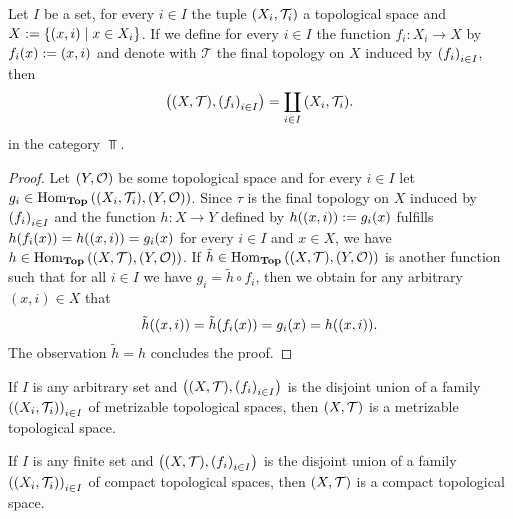 \begin{lemma}
	Let $I$ be a set, for every $i \in I$ the tuple ${\left ( X_i, \mathcal{T}_i \right )}$ a topological space and $X := {\left \{ {\left ( x, i \right )} \mid x \in X_i \right \}}$. If we define for every $i \in I$ the function $f_i: X_i \to X$ by $f_i(x) := {\left ( x, i \right )}$ and denote with $\mathcal{T}$ the final topology on $X$ induced by ${\left ( f_i \right )}_{i \in I}$, then
	\begin{align*}
		\pbraces{\tspace, \pbraces{f_i}_{i \in I}} = \coprod_{i \in I} \pbraces{X_i, \mathcal{T}_i}.
	\end{align*}
	in the category $\Top$. 
\end{lemma}
\begin{proof}
	Let $\tspace[Y][O]$ be some topological space and for every $i \in I$ let $g_i \in \Hom_\Top\pbraces{\pbraces{X_i, \mathcal{T}_i}, \tspace[Y][O]}$. Since $\tau$ is the final topology on $X$ induced by ${\left ( f_i \right )}_{i \in I}$ and the function $h: X \to Y$ defined by $h{\left ( (x,i) \right )} := g_i(x)$ fulfills $h{\left ( f_i(x) \right )} = h{\left ( (x,i) \right )} = g_i(x)$ for every $i \in I$ and $x \in X$, we have $h \in \Hom_\Top\pbraces{\tspace, \tspace[Y][O]}$. 
	If $\tilde{h} \in \Hom_\Top\pbraces{\tspace, \tspace[Y][O]}$ is another function such that for all $i \in I$ we have $g_i = \tilde{h} \circ f_i$, then we obtain for any arbitrary $(x,i) \in X$ that
	\begin{align*}
		\tilde{h}{\left ( (x,i) \right )} = \tilde{h}{\left ( f_i(x) \right )} = g_i(x) = h{\left ( (x,i) \right )}.
	\end{align*}
	The observation $\tilde{h} = h$ concludes the proof.
\end{proof}

\begin{lemma}\label{lemma:disjoint_met}
	If $I$ is any arbitrary set and $\pbraces{\tspace, \pbraces{f_i}_{i \in I}}$ is the disjoint union of a family $\pbraces{\indtspace}_{i \in I}$ of metrizable topological spaces, then $\tspace$ is a metrizable topological space. 
\end{lemma}

\begin{lemma}\label{lemma:disjoint_comp}
	If $I$ is any finite set and $\pbraces{\tspace, \pbraces{f_i}_{i \in I}}$ is the disjoint union of a family $\pbraces{\indtspace}_{i \in I}$ of compact topological spaces, then $\tspace$ is a compact topological space. 
\end{lemma}